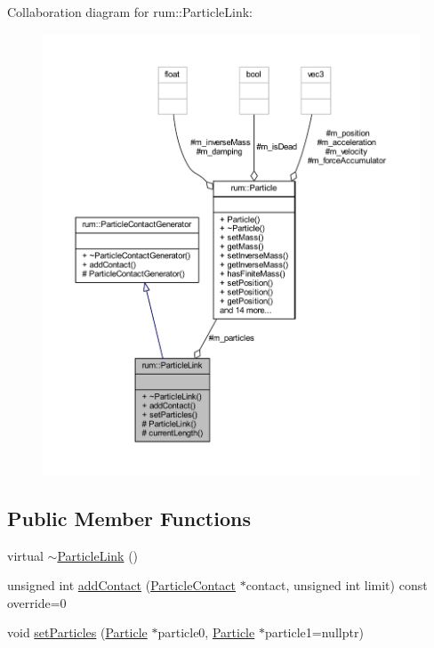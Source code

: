 Collaboration diagram for rum\+:\+:Particle\+Link\+:\nopagebreak
\begin{figure}[H]
\begin{center}
\leavevmode
\includegraphics[width=350pt]{classrum_1_1_particle_link__coll__graph}
\end{center}
\end{figure}
\subsection*{Public Member Functions}
\begin{DoxyCompactItemize}
\item 
virtual \mbox{\hyperlink{classrum_1_1_particle_link_a93add8689cecd885bfe9652d3d9dc440}{$\sim$\+Particle\+Link}} ()
\item 
unsigned int \mbox{\hyperlink{classrum_1_1_particle_link_a0da76619bd1d2ae04d5f8173c2883ff2}{add\+Contact}} (\mbox{\hyperlink{classrum_1_1_particle_contact}{Particle\+Contact}} $\ast$contact, unsigned int limit) const override=0
\item 
void \mbox{\hyperlink{classrum_1_1_particle_link_a9c9c83b1752a6b7e8d95658218402128}{set\+Particles}} (\mbox{\hyperlink{classrum_1_1_particle}{Particle}} $\ast$particle0, \mbox{\hyperlink{classrum_1_1_particle}{Particle}} $\ast$particle1=nullptr)
\end{DoxyCompactItemize}

